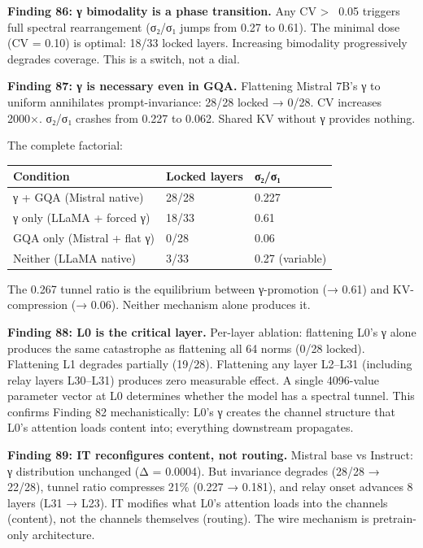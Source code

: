 \documentclass[12pt]{article}
\begin{document}
\textbf{Finding 86: γ bimodality is a phase transition.} Any CV > ~0.05 triggers full spectral rearrangement (σ₂/σ₁ jumps from 0.27 to 0.61). The minimal dose (CV = 0.10) is optimal: 18/33 locked layers. Increasing bimodality progressively degrades coverage. This is a switch, not a dial.

\textbf{Finding 87: γ is necessary even in GQA.} Flattening Mistral 7B's γ to uniform annihilates prompt-invariance: 28/28 locked → 0/28. CV increases 2000×. σ₂/σ₁ crashes from 0.227 to 0.062. Shared KV without γ provides nothing.

The complete factorial:

\begin{table}[h]
\centering
\small
\begin{tabular}{lll}
\toprule
\textbf{Condition} & \textbf{Locked layers} & \textbf{σ₂/σ₁} \\
\midrule
γ + GQA (Mistral native) & 28/28 & 0.227 \\
γ only (LLaMA + forced γ) & 18/33 & 0.61 \\
GQA only (Mistral + flat γ) & 0/28 & 0.06 \\
Neither (LLaMA native) & 3/33 & 0.27 (variable) \\
\bottomrule
\end{tabular}
\end{table}


The 0.267 tunnel ratio is the equilibrium between γ-promotion (→ 0.61) and KV-compression (→ 0.06). Neither mechanism alone produces it.

\textbf{Finding 88: L0 is the critical layer.} Per-layer ablation: flattening L0's γ alone produces the same catastrophe as flattening all 64 norms (0/28 locked). Flattening L1 degrades partially (19/28). Flattening any layer L2–L31 (including relay layers L30–L31) produces zero measurable effect. A single 4096-value parameter vector at L0 determines whether the model has a spectral tunnel. This confirms Finding 82 mechanistically: L0's γ creates the channel structure that L0's attention loads content into; everything downstream propagates.

\textbf{Finding 89: IT reconfigures content, not routing.} Mistral base vs Instruct: γ distribution unchanged (Δ = 0.0004). But invariance degrades (28/28 → 22/28), tunnel ratio compresses 21\% (0.227 → 0.181), and relay onset advances 8 layers (L31 → L23). IT modifies what L0's attention loads into the channels (content), not the channels themselves (routing). The wire mechanism is pretrain-only architecture.
\end{document}

